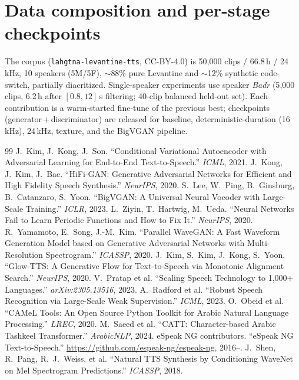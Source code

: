 \documentclass[10pt,twocolumn]{article}
\begin{document}
\section{Data composition and per-stage checkpoints}
\label{app:data}
The corpus (\texttt{lahgtna-levantine-tts}, CC-BY-4.0) is 50{,}000 clips / 66.8\,h / 24\,kHz,
10 speakers (5M/5F), \(\sim\)88\% pure Levantine and \(\sim\)12\% synthetic code-switch,
partially diacritized. Single-speaker experiments use speaker \emph{Badr} (5{,}000 clips,
6.2\,h after \([0.8,12]\)\,s filtering; 40-clip balanced held-out set). Each contribution is a
warm-started fine-tune of the previous best; checkpoints (generator\,+\,discriminator) are
released for baseline, deterministic-duration (16\,kHz), 24\,kHz, texture, and the BigVGAN
pipeline.

\twocolumn
{\small
\begin{thebibliography}{99}
 J.~Kim, J.~Kong, J.~Son. ``Conditional Variational Autoencoder with
Adversarial Learning for End-to-End Text-to-Speech.'' \emph{ICML}, 2021.
 J.~Kong, J.~Kim, J.~Bae. ``HiFi-GAN: Generative Adversarial Networks for
Efficient and High Fidelity Speech Synthesis.'' \emph{NeurIPS}, 2020.
 S.~Lee, W.~Ping, B.~Ginsburg, B.~Catanzaro, S.~Yoon. ``BigVGAN: A Universal
Neural Vocoder with Large-Scale Training.'' \emph{ICLR}, 2023.
 L.~Ziyin, T.~Hartwig, M.~Ueda. ``Neural Networks Fail to Learn Periodic
Functions and How to Fix It.'' \emph{NeurIPS}, 2020.
 R.~Yamamoto, E.~Song, J.-M.~Kim. ``Parallel WaveGAN: A Fast Waveform Generation
Model based on Generative Adversarial Networks with Multi-Resolution Spectrogram.''
\emph{ICASSP}, 2020.
 J.~Kim, S.~Kim, J.~Kong, S.~Yoon. ``Glow-TTS: A Generative Flow for
Text-to-Speech via Monotonic Alignment Search.'' \emph{NeurIPS}, 2020.
 V.~Pratap et al. ``Scaling Speech Technology to 1,000+ Languages.''
\emph{arXiv:2305.13516}, 2023.
 A.~Radford et al. ``Robust Speech Recognition via Large-Scale Weak
Supervision.'' \emph{ICML}, 2023.
 O.~Obeid et al. ``CAMeL Tools: An Open Source Python Toolkit for Arabic
Natural Language Processing.'' \emph{LREC}, 2020.
 M.~Saeed et al. ``CATT: Character-based Arabic Tashkeel Transformer.''
\emph{ArabicNLP}, 2024.
 eSpeak NG contributors. ``eSpeak NG Text-to-Speech.''
\url{https://github.com/espeak-ng/espeak-ng}, 2016--.
 J.~Shen, R.~Pang, R.~J.~Weiss, et al. ``Natural TTS Synthesis by
Conditioning WaveNet on Mel Spectrogram Predictions.'' \emph{ICASSP}, 2018.

\end{thebibliography}}
\end{document}
